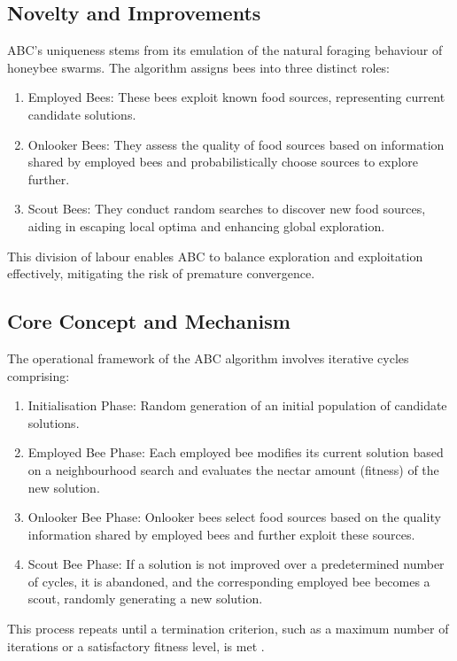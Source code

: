 \documentclass[a4paper, 12pt]{extarticle}
\begin{document}
\subsection{Novelty and Improvements}
ABC's uniqueness stems from its emulation of the natural foraging behaviour of honeybee swarms. The algorithm assigns bees into three distinct roles: \cite{karaboga2007powerful}\cite{karaboga2007artificial}
\begin{enumerate}
    \item Employed Bees: These bees exploit known food sources, representing current candidate solutions.
    \item Onlooker Bees: They assess the quality of food sources based on information shared by employed bees and probabilistically choose sources to explore further.
    \item Scout Bees: They conduct random searches to discover new food sources, aiding in escaping local optima and enhancing global exploration. 
\end{enumerate}

This division of labour enables ABC to balance exploration and exploitation effectively, mitigating the risk of premature convergence.

\subsection{Core Concept and Mechanism}

The operational framework of the ABC algorithm involves iterative cycles comprising:
\begin{enumerate}
    \item Initialisation Phase: Random generation of an initial population of candidate solutions.
    \item Employed Bee Phase: Each employed bee modifies its current solution based on a neighbourhood search and evaluates the nectar amount (fitness) of the new solution.
    \item Onlooker Bee Phase: Onlooker bees select food sources based on the quality information shared by employed bees and further exploit these sources.
    \item Scout Bee Phase: If a solution is not improved over a predetermined number of cycles, it is abandoned, and the corresponding employed bee becomes a scout, randomly generating a new solution.
\end{enumerate}

This process repeats until a termination criterion, such as a maximum number of iterations or a satisfactory fitness level, is met \cite{karaboga2007artificial}.
\end{document}
